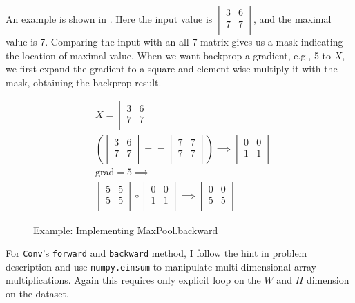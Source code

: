 \documentclass{article}
\begin{document}
An example is shown in . Here the input
value is $\left[\begin{array}{cc}3 & 6 \\ 7 & 7\\\end{array}\right]$, and the
maximal value is 7. Comparing the input with an all-7 matrix gives us a mask
indicating the location of maximal value. When we want backprop a gradient,
e.g., 5 to $X$, we first expand the gradient to a square and element-wise
multiply it with the mask, obtaining the backprop result.
\begin{figure}
\begin{align*}
&X = \left[\begin{array}{cc}
3 & 6 \\ 7 & 7\\  
\end{array}\right] \\
&\left(\left[\begin{array}{cc}
3 & 6 \\ 7 & 7\\  
\end{array}\right] 
 == \left[\begin{array}{cc}
7 & 7 \\ 7 & 7\\  
\end{array}\right]\right) \implies
\left[\begin{array}{cc}
0 & 0 \\ 1 & 1\\  
\end{array}\right]  \\
& \text{grad} = 5 \implies \\&\left[\begin{array}{cc}
5 & 5 \\ 5 & 5\\  
\end{array}\right] \circ \left[\begin{array}{cc}
0 & 0 \\ 1 & 1\\  
\end{array}\right] \implies \left[\begin{array}{cc}
0 & 0 \\ 5 & 5\\  
\end{array}\right]
\end{align*}
\caption{Example: Implementing MaxPool.backward}
\label{fig:backexample}
\end{figure}

For \texttt{Conv}'s \texttt{forward} and \texttt{backward} method, I follow
the hint in problem description and use \texttt{numpy.einsum} to manipulate
multi-dimensional array multiplications. Again this requires only explicit loop
on the $W$ and $H$ dimension on the dataset.
\end{document}
